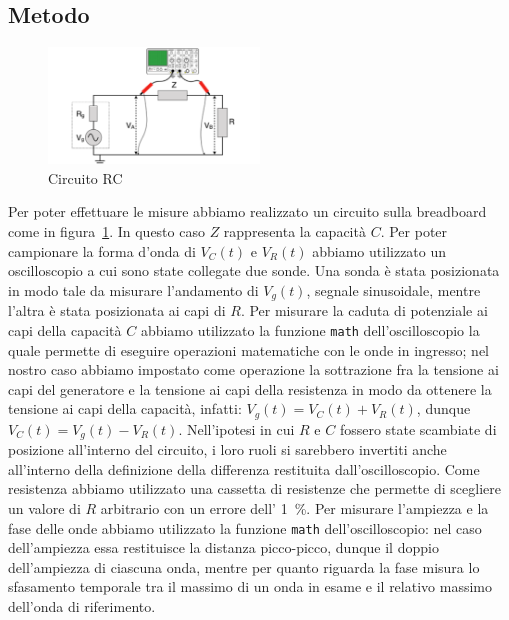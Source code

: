 \documentclass[a4paper]{article}
\begin{document}
\subsection{Metodo}
\begin{figure}[htbp]
	\centering
	\includegraphics[width=0.5\textwidth]{grafici/circuito-rc.png}
	\caption{Circuito RC}
	\label{fig:rc_circuito}
\end{figure}
Per poter effettuare le misure abbiamo realizzato un circuito sulla breadboard come in figura~\ref{fig:rc_circuito}. In questo caso $Z$ rappresenta la capacità $C$. Per poter campionare la forma d'onda di $V_C(t)$ e $V_R(t)$ abbiamo utilizzato un oscilloscopio a cui sono state collegate due sonde. Una sonda è stata posizionata in modo tale da misurare l'andamento di $V_g(t)$, segnale sinusoidale, mentre l'altra è stata posizionata ai capi di $R$. Per misurare la caduta di potenziale ai capi della capacità $C$ abbiamo utilizzato la funzione \texttt{math} dell'oscilloscopio la quale permette di eseguire operazioni matematiche con le onde in ingresso; nel nostro caso abbiamo impostato come operazione la sottrazione fra la tensione ai capi del generatore e la tensione ai capi della resistenza in modo da ottenere la tensione ai capi della capacità, infatti:
$V_g(t) = V_C(t) + V_R(t)$, dunque $V_C(t) = V_g(t) - V_R(t)$. Nell'ipotesi in cui $R$ e $C$ fossero state scambiate di posizione all'interno del circuito, i loro ruoli si sarebbero invertiti anche all'interno della definizione della differenza restituita dall'oscilloscopio.
Come resistenza abbiamo utilizzato una cassetta di resistenze che permette di scegliere un valore di $R$ arbitrario con un errore dell' \SI{1}{\percent}. Per misurare l'ampiezza e la fase delle onde abbiamo utilizzato la funzione \texttt{math} dell'oscilloscopio: nel caso dell'ampiezza essa restituisce la distanza picco-picco, dunque il doppio dell'ampiezza di ciascuna onda, mentre per quanto riguarda la fase misura lo sfasamento temporale tra il massimo di un onda in esame e il relativo massimo dell'onda di riferimento.
\end{document}

